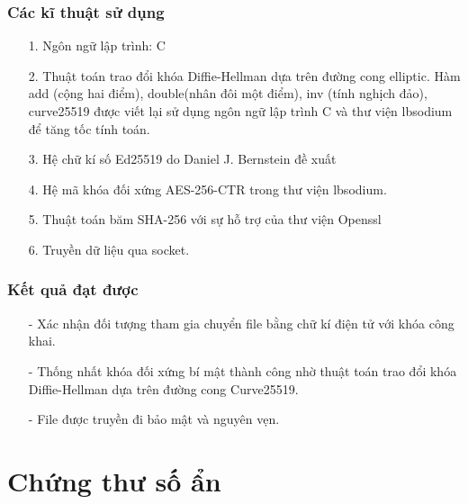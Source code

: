 \documentclass[a4paper,12pt]{report}
\begin{document}
\subsubsection*{Các kĩ thuật sử dụng}
\begin{itemize}
\item[1. ] Ngôn ngữ lập trình: C
\item[2. ] Thuật toán trao đổi khóa Diffie-Hellman dựa trên đường cong elliptic. Hàm add (cộng hai điểm), double(nhân đôi một điểm), inv (tính nghịch đảo), curve25519 được viết lại sử
dụng ngôn ngữ lập trình C và thư viện lbsodium để tăng tốc tính toán.
\item[3. ] Hệ chữ kí số Ed25519 do Daniel J. Bernstein đề xuất
\item[4. ] Hệ mã khóa đối xứng AES-256-CTR trong thư viện lbsodium.
\item[5. ] Thuật toán băm SHA-256 với sự hỗ trợ của thư viện Openssl
\item[6. ] Truyền dữ liệu qua socket.
\end{itemize}
\subsubsection*{Kết quả đạt được}
\begin{itemize}
\item[-] Xác nhận đối tượng tham gia chuyển file bằng chữ kí điện tử với khóa công khai.
\item[-] Thống nhất khóa đối xứng bí mật thành công nhờ thuật toán trao đổi khóa Diffie-Hellman dựa trên đường cong Curve25519.
\item[-] File được truyền đi bảo mật và nguyên vẹn.
\end{itemize}
\section{Chứng thư số ẩn}
\end{document}

